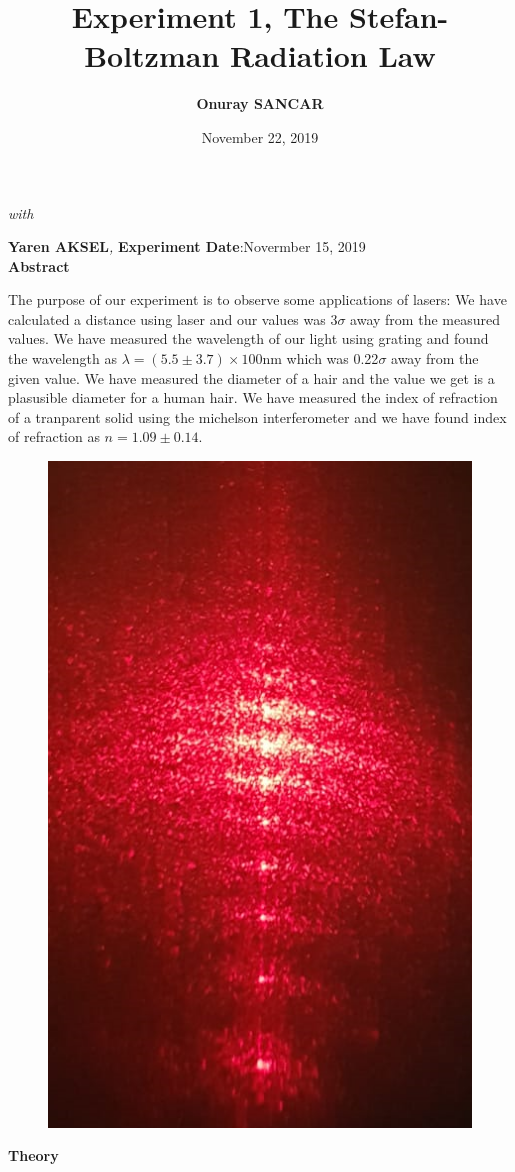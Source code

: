 \documentclass[10pt,a4paper]{article}
\begin{document}
\author{\textbf{Onuray SANCAR}}
\title{\textbf{Experiment 1, The Stefan-Boltzman Radiation Law}}
\date{November 22, 2019}
\maketitle
\textit{with} {\large\textbf{{Yaren AKSEL}}\textit{,} \textbf{Experiment Date}:Novermber 15, 2019\\[3\baselineskip]
\textbf{Abstract}\\[\baselineskip]
\par The purpose of our experiment is to observe some applications of lasers: We have calculated a distance using laser and our values was $3\sigma$ away from the measured values. We have measured the wavelength of our light using grating and found the wavelength as $\lambda=(5.5\pm3.7)\times100$nm which was 0.22$\sigma$ away from the given value. We have measured the diameter of a hair and the value we get is a plasusible diameter for a human hair. We have measured the index of refraction of a tranparent solid using the michelson interferometer and we have found index of refraction as $n=1.09\pm0.14$.
\begin{figure}[H]
	\begin{center}
		\includegraphics[scale=0.5]{doubleslit.png}
	\end{center}
\end{figure}
\textbf{Theory}\\[\baselineskip]


}
\end{document}
